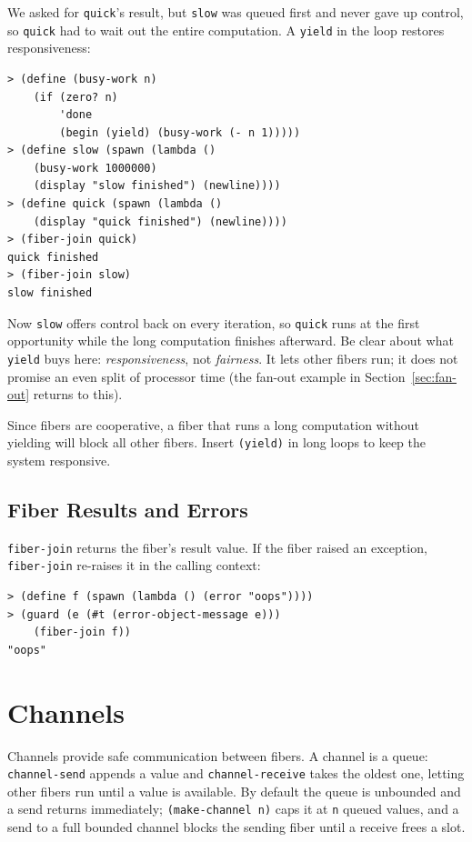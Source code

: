 We asked for \texttt{quick}'s result, but \texttt{slow} was queued first and never gave up control, so \texttt{quick} had to wait out the entire computation. A \texttt{yield} in the loop restores responsiveness:

\begin{lstlisting}[style=repl]
> (define (busy-work n)
    (if (zero? n)
        'done
        (begin (yield) (busy-work (- n 1)))))
> (define slow (spawn (lambda ()
    (busy-work 1000000)
    (display "slow finished") (newline))))
> (define quick (spawn (lambda ()
    (display "quick finished") (newline))))
> (fiber-join quick)
quick finished
> (fiber-join slow)
slow finished
\end{lstlisting}

Now \texttt{slow} offers control back on every iteration, so \texttt{quick} runs at the first opportunity while the long computation finishes afterward. Be clear about what \texttt{yield} buys here: \emph{responsiveness}, not \emph{fairness}. It lets other fibers run; it does not promise an even split of processor time (the fan-out example in Section~\ref{sec:fan-out} returns to this).

\begin{warning}
Since fibers are cooperative, a fiber that runs a long computation without yielding will block all other fibers. Insert \texttt{(yield)} in long loops to keep the system responsive.
\end{warning}

\subsection{Fiber Results and Errors}

\texttt{fiber-join} returns the fiber's result value. If the fiber raised an exception, \texttt{fiber-join} re-raises it in the calling context:

\begin{lstlisting}[style=repl]
> (define f (spawn (lambda () (error "oops"))))
> (guard (e (#t (error-object-message e)))
    (fiber-join f))
"oops"
\end{lstlisting}

\section{Channels}

Channels provide safe communication between fibers. A channel is a queue: \texttt{channel-send} appends a value and \texttt{channel-receive} takes the oldest one, letting other fibers run until a value is available. By default the queue is unbounded and a send returns immediately; \texttt{(make-channel n)} caps it at \texttt{n} queued values, and a send to a full bounded channel blocks the sending fiber until a receive frees a slot.

